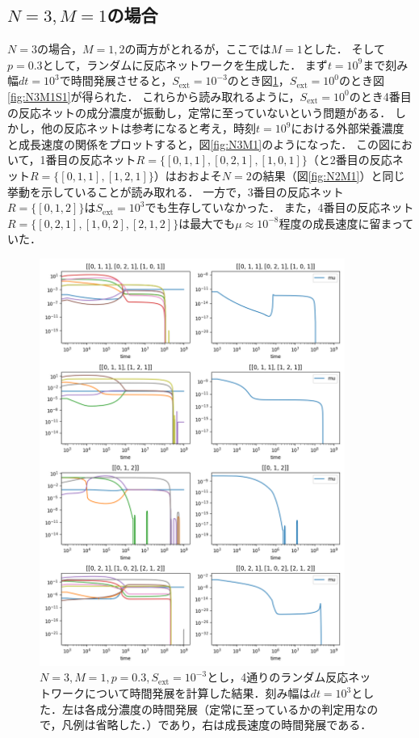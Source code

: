 \documentclass[a4paper,11pt]{jsarticle}
\begin{document}
\subsection{$N=3,M=1$の場合}
$N=3$の場合，$M=1,2$の両方がとれるが，ここでは$M=1$とした．
そして$p=0.3$として，ランダムに反応ネットワークを生成した．
まず$t=10^{9}$まで刻み幅$dt=10^3$で時間発展させると，$S_{\mathrm{ext}}=10^{-3}$のとき図\ref{fig:N3M1S-3}，$S_{\mathrm{ext}}=10^{0}$のとき図\ref{fig:N3M1S1}が得られた．
これらから読み取れるように，$S_{\mathrm{ext}}= 10^{0}$のとき4番目の反応ネットの成分濃度が振動し，定常に至っていないという問題がある．
しかし，他の反応ネットは参考になると考え，時刻$t=10^9$における外部栄養濃度と成長速度の関係をプロットすると，図\ref{fig:N3M1}のようになった．
この図において，1番目の反応ネット$R=\{[0,1,1],[0,2,1],[1,0,1]\}$（と2番目の反応ネット$R=\{[0,1,1],[1,2,1]\}$）はおおよそ$N=2$の結果（図\ref{fig:N2M1}）と同じ挙動を示していることが読み取れる．
一方で，3番目の反応ネット$R=\{[0,1,2]\}$は$S_{\mathrm{ext}}=10^3$でも生存していなかった．
また，4番目の反応ネット$R=\{[0,2,1],[1,0,2],[2,1,2]\}$は最大でも$\mu\approx 10^{-8}$程度の成長速度に留まっていた．

\begin{figure}[htbp]
  \centering
  \includegraphics[width=10cm]{himeoka_timser_N3_M1_TMAX9_div6_NPLT5_Sext-3.png}
  \caption{$N=3,M=1,p=0.3,S_{\mathrm{ext}}=10^{-3}$とし，4通りのランダム反応ネットワークについて時間発展を計算した結果．刻み幅は$dt=10^3$とした．左は各成分濃度の時間発展（定常に至っているかの判定用なので，凡例は省略した．）であり，右は成長速度の時間発展である．}
  \label{fig:N3M1S-3}
\end{figure}
\end{document}
